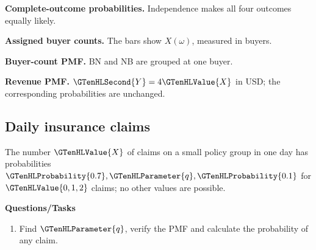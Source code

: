 \par\noindent \begin{minipage}[t]{.485\linewidth}
\centering
{}
\par\small \textbf{Complete-outcome probabilities.} Independence makes all four outcomes equally likely.
\end{minipage}\hfill\begin{minipage}[t]{.485\linewidth}
\centering
{}
\par\small \textbf{Assigned buyer counts.} The bars show $X(\omega)$, measured in buyers.
\end{minipage}\par\medskip
\par\noindent \begin{minipage}[t]{.485\linewidth}
\centering
{}
\par\small \textbf{Buyer-count PMF.} BN and NB are grouped at one buyer.
\end{minipage}\hfill\begin{minipage}[t]{.485\linewidth}
\centering
{}
\par\small \textbf{Revenue PMF.} $\GTenHLSecond{Y}=4\GTenHLValue{X}$ in USD; the corresponding probabilities are unchanged.
\end{minipage}\par\medskip

\subsection{Daily insurance claims}
The number $\GTenHLValue{X}$ of claims on a small policy group in one day has probabilities $\GTenHLProbability{0.7},\GTenHLParameter{q},\GTenHLProbability{0.1}$ for $\GTenHLValue{0,1,2}$ claims; no other values are possible.

\textbf{Questions/Tasks}
\begin{enumerate}
\item Find $\GTenHLParameter{q}$, verify the PMF and calculate the probability of any claim.
\end{enumerate}
